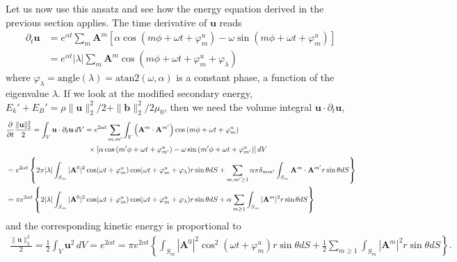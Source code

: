 Let us now use this ansatz and see how the energy equation derived in the previous section applies. The time derivative of $\mathbf{u}$ reads
%
\begin{equation}
\begin{aligned}
    \partial_t \mathbf{u} &= e^{\alpha t} \sum_m \mathbf{A}^m \left[\alpha \cos \left(m\phi + \omega t + \varphi_m^u\right) - \omega \sin \left(m\phi + \omega t + \varphi_m^u\right)\right] \\
    &= e^{\alpha t} |\lambda| \sum_m \mathbf{A}^m \cos(m\phi + \omega t + \varphi_m^u + \varphi_\lambda)
\end{aligned}
\end{equation}
%
where $\varphi_\lambda = \mathrm{angle}(\lambda) = \mathrm{atan2}(\omega, \alpha)$ is a constant phase, a function of the eigenvalue $\lambda$. If we look at the modified secondary energy, $E_{k}' + E_B' = \rho \|\mathbf{u}\|_2^2/2 + \|\mathbf{b}\|_2^2/2\mu_0$, then we need the volume integral $\mathbf{u}\cdot \partial_t \mathbf{u}$,
%
\begin{equation}
\begin{aligned}
    &\frac{\partial}{\partial t} \frac{\|\mathbf{u}\|_2^2}{2} = \int_V \mathbf{u}\cdot \partial_t \mathbf{u} \, dV = e^{2\alpha t} \sum_{m,m'} \int_V \left(\mathbf{A}^m \cdot \mathbf{A}^{m'}\right)  \cos \left(m\phi + \omega t + \varphi_m^u\right) \\
    &\mkern200mu \times \left[\alpha \cos \left(m'\phi + \omega t + \varphi_{m'}^u\right) - \omega \sin \left(m'\phi + \omega t + \varphi_{m'}^u\right)\right] dV \\ 
    &= e^{2\alpha t} \left\{2\pi|\lambda| \int_{S_m} |\mathbf{A}^0|^2 \cos(\omega t + \varphi_m^u) \cos(\omega t + \varphi_m^u + \varphi_\lambda) r\sin\theta dS + \sum_{m,m' \geq 1} \alpha \pi \delta_{mm'} \int_{S_m} \mathbf{A}^m \cdot \mathbf{A}^{m'} r\sin\theta dS\right\} \\ 
    &= \pi e^{2\alpha t} \left\{2|\lambda| \int_{S_m} |\mathbf{A}^0|^2 \cos(\omega t + \varphi_m^u) \cos(\omega t + \varphi_m^u + \varphi_\lambda) r\sin\theta dS + \alpha \sum_{m \geq 1} \int_{S_m} |\mathbf{A}^m|^2 r\sin\theta dS\right\}
\end{aligned}
\end{equation}
%
and the corresponding kinetic energy is proportional to 
%
\begin{equation}
\begin{aligned}
    \frac{\|\mathbf{u}\|_2^2}{2} = \frac{1}{2}\int_V \mathbf{u}^2 \, dV = e^{2\alpha t} = \pi e^{2\alpha t} \left\{\int_{S_m} |\mathbf{A}^0|^2 \cos^2(\omega t + \varphi_m^u) r\sin\theta dS + \frac{1}{2} \sum_{m\geq 1} \int_{S_m} |\mathbf{A}^m|^2 r\sin\theta dS \right\}.
\end{aligned}
\end{equation}
